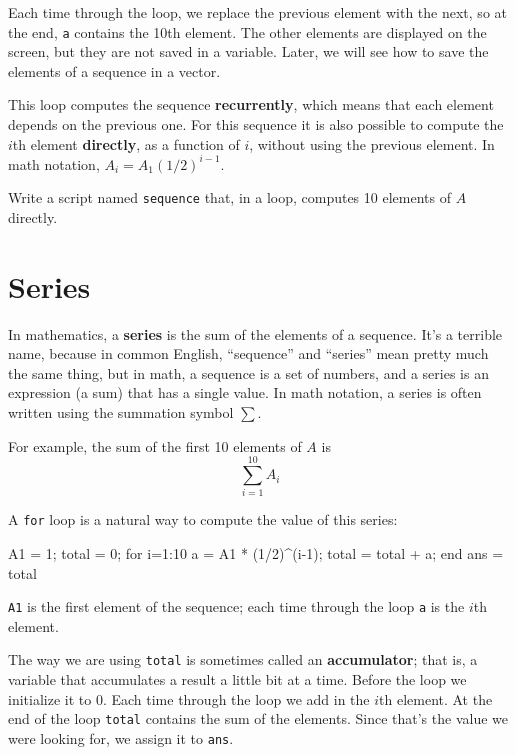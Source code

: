 \documentclass[
]{book}
\numberwithin{Answer}{chapter}
\numberwithin{Exercise}{chapter}
\begin{document}
Each time through the loop, we replace the previous element with
the next, so at the end, {\tt a} contains the 10th element.  The
other elements are displayed on the screen, but they are not saved
in a variable.  Later, we will see how to save the elements
of a sequence in a vector.


This loop computes the sequence {\bf recurrently}, which means
that each element depends on the previous one.
For this sequence it is also possible to compute the $i$th element
{\bf directly}, as a function of $i$, without using the previous element.
In math notation, $A_i = A_1 (1/2)^{i-1}$. 

\begin{ex}
Write a script named {\tt sequence} that, in a loop, 
computes 10 elements of $A$ directly.
\end{ex}


\section{Series}
\label{sect:series}

In mathematics, a {\bf series} is the sum of the elements of
a sequence.  It's a terrible name, because in common English,
``sequence'' and ``series'' mean pretty much the same thing, but in
math, a sequence is a set of numbers, and a series is an expression
(a sum) that has a single value.  In math notation, a series
is often written using the summation symbol $\sum$.


For example, the sum of the first 10 elements of $A$ is
\begin{equation}
\sum_{i=1}^{10} A_i
\end{equation}

A {\tt for} loop is a natural way to compute the value of this
series:

\begin{code}
A1 = 1;
total = 0;
for i=1:10
    a = A1 * (1/2)^(i-1);
    total = total + a;
end
ans = total
\end{code}

{\tt A1} is the first element of the sequence; each time
through the loop {\tt a} is the $i$th element.


The way we are using {\tt total} is sometimes called an {\bf
accumulator}; that is, a variable that accumulates a result a little
bit at a time.  
Before the loop we initialize it to 0.  
Each time
through the loop we add in the $i$th element.  
At the end of the loop
{\tt total} contains the sum of the elements.  
Since that's the value
we were looking for, we assign it to {\tt ans}.
\end{document}
